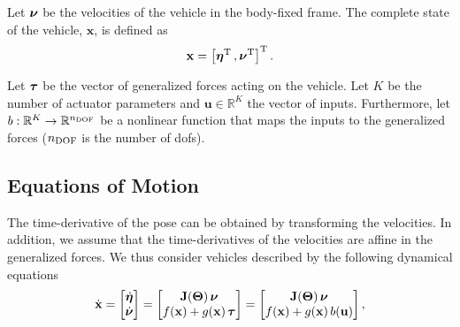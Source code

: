 Let $\bm{\nu}$ be the velocities of the vehicle in the body-fixed frame.
%
The complete state of the vehicle, $\mathbf{x}$, is defined as
\begin{equation}
    \mathbf{x} = \left[ \bm{\eta}^{\rm T} \,, \bm{\nu}^{\rm T} \right]^{\rm T}.
\end{equation}

Let $\bm{\tau}$ be the vector of generalized forces acting on the vehicle.
Let $K$ be the number of actuator parameters and $\mathbf{u} \in \mathbb{R}^{K}$ the vector of inputs.
Furthermore, let $b : \mathbb{R}^{K} \rightarrow \mathbb{R}^{n_{\rm DOF}}$ be a nonlinear function that maps the inputs to the generalized forces ($n_{\rm DOF}$ is the number of \glspl{dof}).

\subsection{Equations of Motion}

The time-derivative of the pose can be obtained by transforming the velocities. %
In addition, we assume that the time-derivatives of the velocities are affine in the generalized forces.
We thus consider vehicles described by the following dynamical equations
\begin{equation}
    \dot{\mathbf{x}} = \begin{bmatrix} \dot{\bm{\eta}} \\ \dot{\bm{\nu}} \end{bmatrix} = \begin{bmatrix}
        \mathbf{J}(\bm{\Theta})\,\bm{\nu} \\ f(\mathbf{x}) + g(\mathbf{x})\,\bm{\tau}
    \end{bmatrix} = \begin{bmatrix}
        \mathbf{J}(\bm{\Theta})\,\bm{\nu} \\ f(\mathbf{x}) + g(\mathbf{x})\,b(\mathbf{u})
    \end{bmatrix},
    \label{eq:ccta_affine_model}
\end{equation}

